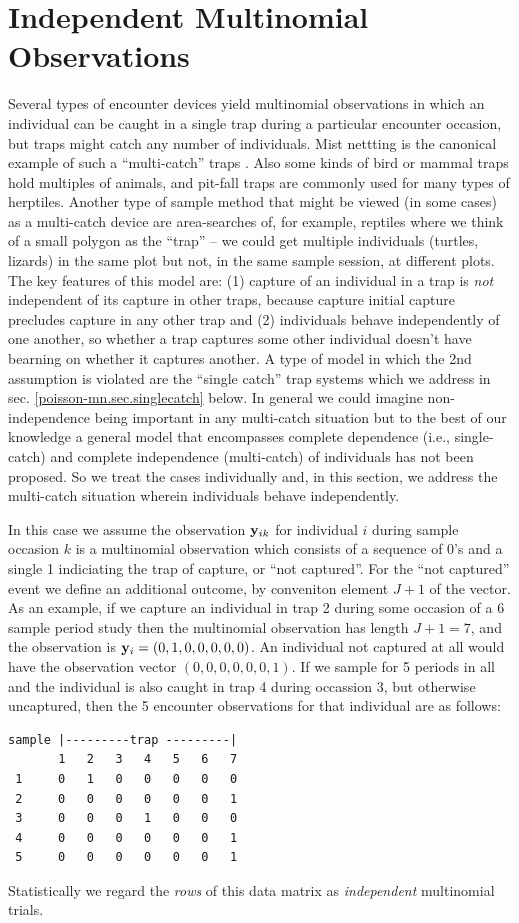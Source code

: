 \section{Independent Multinomial Observations}

Several types of encounter devices yield multinomial observations in
which an individual can be caught in a single trap during a particular
encounter occasion, but traps might catch any number of individuals.
Mist nettting is the canonical example of such a ``multi-catch'' traps
\citep{efford_etal:2009euring}. Also some kinds of bird or mammal
traps hold multiples of animals, and pit-fall traps are commonly used
for many types of herptiles.  Another type of sample method that might
be viewed (in some cases) as a multi-catch device are area-searches
of, for example, reptiles where we think of a small polygon as the
``trap'' -- we could get multiple individuals (turtles, lizards) in
the same plot but not, in the same sample session, at different plots.
The key features of this model are: (1) capture of an individual in a
trap is {\it not} independent of its capture in other traps, because
capture initial capture
 precludes capture in any other trap and (2)
individuals  behave independently of one another, so 
whether a trap captures some other
individual doesn't have bearning on whether it captures another.  A
type of model in which the
2nd 
assumption is violated  are the ``single
catch'' trap systems which we address in
sec. \ref{poisson-mn.sec.singlecatch} below. In general we could
imagine non-independence being important in any multi-catch situation
but to the best of our knowledge a general model that encompasses
complete dependence (i.e., single-catch) and complete independence
(multi-catch) of individuals has not been proposed.  So we treat the
cases individually and, in this section, we address the multi-catch
situation wherein individuals behave independently.


In this case we assume the observation ${\bf y}_{ik}$ for individual
$i$ during sample occasion $k$ is a multinomial observation which
consists of a sequence of 0's and  a single 1 indiciating the
trap of capture, or ``not captured''. For the ``not captured'' event
we define an additional outcome, by conveniton element $J+1$ of the
vector.  As an example, if we capture an individual in trap 2 during
some occasion of a
6 sample period study then the multinomial observation has length $J+1
= 7$, and the observation is ${\bf y}_{i} = (0,1,0,0,0,0,0)$. An
individual not captured at all would have the observation vector
$(0,0,0,0,0,0,1)$.  If we sample for 5 periods in all and the
individual is also caught in trap 4 during occassion 3, but otherwise
uncaptured, then the 5 encounter observations for that individual are
as follows:
\begin{verbatim}
sample |---------trap ---------|
       1   2   3   4   5   6   7
 1     0   1   0   0   0   0   0
 2     0   0   0   0   0   0   1
 3     0   0   0   1   0   0   0
 4     0   0   0   0   0   0   1
 5     0   0   0   0   0   0   1
\end{verbatim}
Statistically we regard the {\it rows} of this data matrix as {\it
  independent} multinomial trials.

